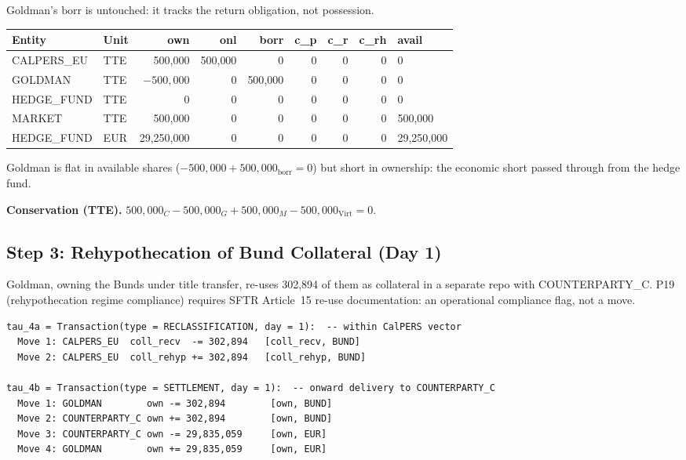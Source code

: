 \noindent Goldman's $\mathrm{borr}$ is untouched: it tracks the return obligation, not possession.

\begin{center}\small
\begin{tabular}{l l r r r r r r l}
\toprule
\textbf{Entity} & \textbf{Unit} & own & onl & borr & c\_p & c\_r & c\_rh & avail \\
\midrule
CALPERS\_EU & TTE & 500{,}000 & 500{,}000 & 0 & 0 & 0 & 0 & 0 \\
GOLDMAN & TTE & $-500{,}000$ & 0 & 500{,}000 & 0 & 0 & 0 & 0 \\
HEDGE\_FUND & TTE & 0 & 0 & 0 & 0 & 0 & 0 & 0 \\
MARKET & TTE & 500{,}000 & 0 & 0 & 0 & 0 & 0 & 500{,}000 \\
HEDGE\_FUND & EUR & 29{,}250{,}000 & 0 & 0 & 0 & 0 & 0 & 29{,}250{,}000 \\
\bottomrule
\end{tabular}
\end{center}

\noindent Goldman is flat in available shares ($-500{,}000 + 500{,}000_{\mathrm{borr}} = 0$) but short in ownership: the economic short passed through from the hedge fund.

\noindent\textbf{Conservation (TTE).} $500{,}000_C - 500{,}000_G + 500{,}000_M - 500{,}000_{\mathrm{Virt}} = 0$. \checkmark

\subsection{Step 3: Rehypothecation of Bund Collateral (Day 1)}
\label{sec:eu-step3}

Goldman, owning the Bunds under title transfer, re-uses 302{,}894 of them as collateral in a separate repo with COUNTERPARTY\_C. P19 (rehypothecation regime compliance) requires SFTR Article~15 re-use documentation: an operational compliance flag, not a move.

\begin{lstlisting}
tau_4a = Transaction(type = RECLASSIFICATION, day = 1):  -- within CalPERS vector
  Move 1: CALPERS_EU  coll_recv  -= 302,894   [coll_recv, BUND]
  Move 2: CALPERS_EU  coll_rehyp += 302,894   [coll_rehyp, BUND]

tau_4b = Transaction(type = SETTLEMENT, day = 1):  -- onward delivery to COUNTERPARTY_C
  Move 1: GOLDMAN        own -= 302,894        [own, BUND]
  Move 2: COUNTERPARTY_C own += 302,894        [own, BUND]
  Move 3: COUNTERPARTY_C own -= 29,835,059     [own, EUR]
  Move 4: GOLDMAN        own += 29,835,059     [own, EUR]
\end{lstlisting}

